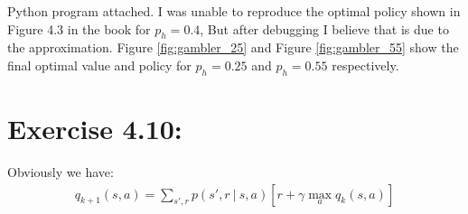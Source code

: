 \documentclass[10pt,letterpaper]{article}
\newcommand\given[1][]{\:#1\vert\:}
\begin{document}
Python program attached. I was unable to reproduce the optimal policy shown in Figure 4.3 in the book for $p_h=0.4$, But after debugging I believe that is due to the approximation. Figure \ref{fig:gambler_25} and Figure \ref{fig:gambler_55} show the final optimal value and policy for $p_h = 0.25$ and $p_h = 0.55$ respectively.


\section*{Exercise 4.10: }
\label{4.10}
Obviously we have:
\begin{align}
q_{k+1}(s,a) = \sum_{s',r}p(s',r\given s,a)[r + \gamma\max_aq_k(s,a)]
\end{align}

\clearpage
\end{document}
